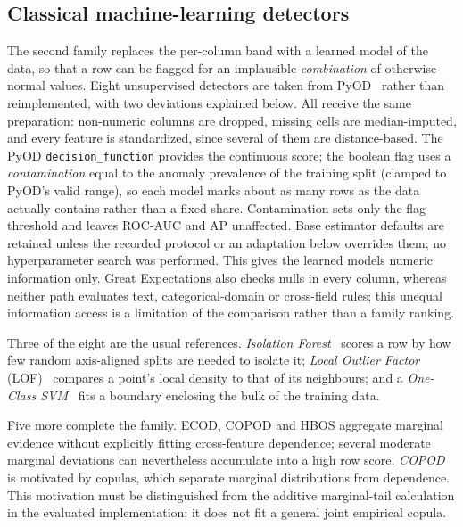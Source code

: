 \documentclass[conference]{IEEEtran}
\begin{document}
\subsection{Classical machine-learning detectors}
The second family replaces the per-column band with a learned model of
the data, so that a row can be flagged for an implausible
\emph{combination} of otherwise-normal values. Eight unsupervised
detectors are taken from PyOD~\cite{zhao2019pyod} rather than
reimplemented, with two deviations explained below. All receive the
same preparation: non-numeric columns are dropped, missing cells are
median-imputed, and every feature is standardized, since several of them
are distance-based. The PyOD \texttt{decision\_function} provides the
continuous score; the boolean flag uses a \emph{contamination} equal to
the anomaly prevalence of the training split (clamped to PyOD's valid
range), so each model marks about as many rows as the data actually
contains rather than a fixed share. Contamination sets only the flag
threshold and leaves ROC-AUC and AP unaffected. Base estimator defaults are retained unless the recorded protocol or an
adaptation below overrides them; no hyperparameter search was performed.
This gives the learned models numeric information only. Great Expectations
also checks nulls in every column, whereas neither path evaluates text,
categorical-domain or cross-field rules; this unequal information access is a
limitation of the comparison rather than a family ranking.

Three of the eight are the usual references. \emph{Isolation
Forest}~\cite{liu2008isolation} scores a row by how few random
axis-aligned splits are needed to isolate it; \emph{Local Outlier
Factor} (LOF)~\cite{breunig2000lof} compares a point's local density to
that of its neighbours; and a \emph{One-Class
SVM}~\cite{scholkopf2001support} fits a boundary enclosing the bulk of
the training data.

Five more complete the family. ECOD, COPOD and HBOS aggregate marginal
evidence without explicitly fitting cross-feature dependence; several moderate
marginal deviations can nevertheless accumulate into a high row score.
\emph{COPOD}~\cite{li2020copod} is motivated by copulas, which separate
marginal distributions from dependence. This motivation must be distinguished
from the additive marginal-tail calculation in the evaluated implementation;
it does not fit a general joint empirical copula.
\end{document}
